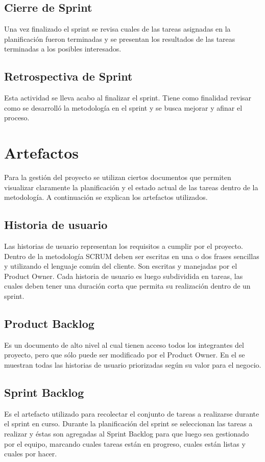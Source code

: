 \subsection{Cierre de Sprint}
Una vez finalizado el sprint se revisa cuales de las tareas asignadas en la planificación
fueron terminadas y se presentan los resultados de las tareas terminadas a los posibles
interesados.

\subsection{Retrospectiva de Sprint}

Esta actividad se lleva acabo al finalizar el sprint. Tiene como finalidad revisar como
se desarrolló la metodología en el sprint y se busca mejorar y afinar el proceso.

\section{Artefactos}

Para la gestión del proyecto se utilizan ciertos documentos que permiten visualizar
claramente la planificación y el estado actual de las tareas dentro de la metodología.
A continuación se explican los artefactos utilizados.

\subsection{Historia de usuario}

Las historias de usuario representan los requisitos a cumplir por el proyecto. Dentro
de la metodología SCRUM deben ser escritas en una o dos frases sencillas y utilizando
el lenguaje común del cliente. Son escritas y manejadas por el Product Owner. Cada
historia de usuario es luego subdividida en tareas, las cuales deben tener una duración
corta que permita su realización dentro de un sprint.

\subsection{Product Backlog}

Es un documento de alto nivel al cual tienen acceso todos los integrantes del proyecto,
pero que sólo puede ser modificado por el Product Owner. En el se muestran todas las
historias de usuario priorizadas según su valor para el negocio.

\subsection{Sprint Backlog}
Es el artefacto utilizado para recolectar el conjunto de tareas a realizarse durante
el sprint en curso. Durante la planificación del sprint se seleccionan las tareas a
realizar y éstas son agregadas al Sprint Backlog para que luego sea gestionado por el
equipo, marcando cuales tareas están en progreso, cuales están listas y cuales por hacer.
